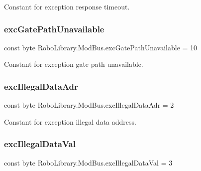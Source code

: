 Constant for exception response timeout.

\hypertarget{class_robo_library_1_1_mod_bus_a94b3937e354438a1e9adc5016c203cfe}{}\label{class_robo_library_1_1_mod_bus_a94b3937e354438a1e9adc5016c203cfe} 
\subsubsection{\texorpdfstring{exc\+Gate\+Path\+Unavailable}{excGatePathUnavailable}}
{\footnotesize\ttfamily const byte Robo\+Library.\+Mod\+Bus.\+exc\+Gate\+Path\+Unavailable = 10}



Constant for exception gate path unavailable.

\hypertarget{class_robo_library_1_1_mod_bus_a2b8c0ab4af8f79c7c914116cf96a3753}{}\label{class_robo_library_1_1_mod_bus_a2b8c0ab4af8f79c7c914116cf96a3753} 
\subsubsection{\texorpdfstring{exc\+Illegal\+Data\+Adr}{excIllegalDataAdr}}
{\footnotesize\ttfamily const byte Robo\+Library.\+Mod\+Bus.\+exc\+Illegal\+Data\+Adr = 2}



Constant for exception illegal data address.

\hypertarget{class_robo_library_1_1_mod_bus_a08b557ce75222b5972a6a5b92b6efa99}{}\label{class_robo_library_1_1_mod_bus_a08b557ce75222b5972a6a5b92b6efa99} 
\subsubsection{\texorpdfstring{exc\+Illegal\+Data\+Val}{excIllegalDataVal}}
{\footnotesize\ttfamily const byte Robo\+Library.\+Mod\+Bus.\+exc\+Illegal\+Data\+Val = 3}



